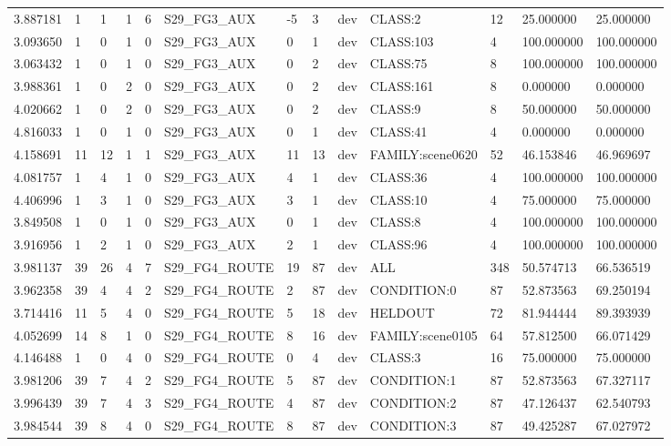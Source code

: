 \begin{tabular}{lllllllllllll}
3.887181 & 1 & 1 & 1 & 6 & S29\_FG3\_AUX & -5 & 3 & dev & CLASS:2 & 12 & 25.000000 & 25.000000 \\
3.093650 & 1 & 0 & 1 & 0 & S29\_FG3\_AUX & 0 & 1 & dev & CLASS:103 & 4 & 100.000000 & 100.000000 \\
3.063432 & 1 & 0 & 1 & 0 & S29\_FG3\_AUX & 0 & 2 & dev & CLASS:75 & 8 & 100.000000 & 100.000000 \\
3.988361 & 1 & 0 & 2 & 0 & S29\_FG3\_AUX & 0 & 2 & dev & CLASS:161 & 8 & 0.000000 & 0.000000 \\
4.020662 & 1 & 0 & 2 & 0 & S29\_FG3\_AUX & 0 & 2 & dev & CLASS:9 & 8 & 50.000000 & 50.000000 \\
4.816033 & 1 & 0 & 1 & 0 & S29\_FG3\_AUX & 0 & 1 & dev & CLASS:41 & 4 & 0.000000 & 0.000000 \\
4.158691 & 11 & 12 & 1 & 1 & S29\_FG3\_AUX & 11 & 13 & dev & FAMILY:scene0620 & 52 & 46.153846 & 46.969697 \\
4.081757 & 1 & 4 & 1 & 0 & S29\_FG3\_AUX & 4 & 1 & dev & CLASS:36 & 4 & 100.000000 & 100.000000 \\
4.406996 & 1 & 3 & 1 & 0 & S29\_FG3\_AUX & 3 & 1 & dev & CLASS:10 & 4 & 75.000000 & 75.000000 \\
3.849508 & 1 & 0 & 1 & 0 & S29\_FG3\_AUX & 0 & 1 & dev & CLASS:8 & 4 & 100.000000 & 100.000000 \\
3.916956 & 1 & 2 & 1 & 0 & S29\_FG3\_AUX & 2 & 1 & dev & CLASS:96 & 4 & 100.000000 & 100.000000 \\
3.981137 & 39 & 26 & 4 & 7 & S29\_FG4\_ROUTE & 19 & 87 & dev & ALL & 348 & 50.574713 & 66.536519 \\
3.962358 & 39 & 4 & 4 & 2 & S29\_FG4\_ROUTE & 2 & 87 & dev & CONDITION:0 & 87 & 52.873563 & 69.250194 \\
3.714416 & 11 & 5 & 4 & 0 & S29\_FG4\_ROUTE & 5 & 18 & dev & HELDOUT & 72 & 81.944444 & 89.393939 \\
4.052699 & 14 & 8 & 1 & 0 & S29\_FG4\_ROUTE & 8 & 16 & dev & FAMILY:scene0105 & 64 & 57.812500 & 66.071429 \\
4.146488 & 1 & 0 & 4 & 0 & S29\_FG4\_ROUTE & 0 & 4 & dev & CLASS:3 & 16 & 75.000000 & 75.000000 \\
3.981206 & 39 & 7 & 4 & 2 & S29\_FG4\_ROUTE & 5 & 87 & dev & CONDITION:1 & 87 & 52.873563 & 67.327117 \\
3.996439 & 39 & 7 & 4 & 3 & S29\_FG4\_ROUTE & 4 & 87 & dev & CONDITION:2 & 87 & 47.126437 & 62.540793 \\
3.984544 & 39 & 8 & 4 & 0 & S29\_FG4\_ROUTE & 8 & 87 & dev & CONDITION:3 & 87 & 49.425287 & 67.027972 \\

\end{tabular}
